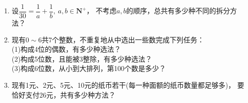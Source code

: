 \begin{enumerate}[label={\textbf{\arabic*.}},leftmargin=
    \inteval{\myenumleftmargin}pt]
\item 设$ \dfrac{1}{30}=\dfrac{1}{a}+\dfrac{1}{b},\ a,b\in\textbf{N}^+ $，
不考虑$ a,b $的顺序，总共有多少种不同的拆分方法？

\item 现有$ 0\sim 6 $共7个整数，不重复地从中选出一些数完成下列任务：\\
(1)构成4位的偶数，有多少种选法？\\
(2)构成5位数，且能被3整除，有多少种选法？\\
(3)构成6位数，从小到大排列，第100个数是多少？

\item 现有1元、2元、5元、10元的纸币若干(每一种面额的纸币数量都足够多)，
要恰好支付26元，共有多少种方法？ 

\end{enumerate}


